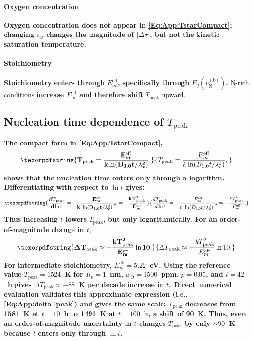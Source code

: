 \documentclass[preprint,12pt,sort&compress]{elsarticle}
\newcommand{\?}{\stackrel{?}{=}}
\providecommand{\DIFaddtex}[1]{{\bf #1}} %
\providecommand{\DIFdeltex}[1]{} %
\providecommand{\DIFaddbegin}{\protect\color{blue}} %
\providecommand{\DIFaddend}{\protect\color{black}} %
\providecommand{\DIFdelbegin}{\protect\color{red}} %
\providecommand{\DIFdelend}{\protect\color{black}} %
\providecommand{\DIFadd}[1]{\texorpdfstring{\DIFaddtex{#1}}{#1}} %
\providecommand{\DIFdel}[1]{\texorpdfstring{\DIFdeltex{#1}}{}} %
\begin{document}
\paragraph{\DIFadd{Oxygen concentration}} \DIFadd{Oxygen concentration does not appear in \cref{Eq:App:TstarCompact}; changing $c_\text{O}$ changes the magnitude of $|\Delta\sigma|$, but not the kinetic saturation temperature.
}

\paragraph{\DIFadd{Stoichiometry}} \DIFadd{Stoichiometry enters through $E_m^\mathrm{eff}$, specifically through }\DIFaddend $E_f(v_\text{N}^{(\text{b})})$\DIFdelbegin \DIFdel{: }\DIFdelend \DIFaddbegin \DIFadd{. }\DIFaddend N-rich conditions \DIFdelbegin \DIFdel{(higher $E_f$) shift }\DIFdelend \DIFaddbegin \DIFadd{increase $E_m^\mathrm{eff}$ and therefore shift }\DIFaddend $T_\text{peak}$ upward.
\DIFdelbegin %
\DIFdelend 

\DIFaddbegin \subsection{\DIFadd{Nucleation time dependence of }\texorpdfstring{$T_\text{peak}$}{Tpeak}}
\label{App:Tpeak:tdep}

\DIFadd{The compact form in \cref{Eq:App:TstarCompact},
}\begin{equation}
\DIFadd{T_\text{peak} = \frac{E_m^\mathrm{eff}}{k\ln\!\left(D_{1,0}t/\lambda_v^2\right)},
}\end{equation}
\DIFadd{shows that the nucleation time enters only through a logarithm. Differentiating with respect to $\ln t$ gives:
}\begin{equation}
\DIFadd{\frac{dT_\text{peak}}{d\ln t} = -\frac{ E_m^\mathrm{eff} }{ k \left[ \ln\!\left(D_{1,0}t/\lambda_v^2\right) \right]^2 }
= -\frac{ kT_\text{peak}^2 }{ E_m^\mathrm{eff} }.
\label{Eq:App:dTpeak_dlogt}
}\end{equation}
\DIFadd{Thus increasing $t$ lowers $T_\text{peak}$, but only logarithmically. For an order-of-magnitude change in $t$,
}\begin{equation}
\DIFadd{\Delta T_\text{peak} \approx -\frac{ kT_\text{peak}^2 }{ E_m^\mathrm{eff} } \ln 10.
\label{Eq:App:deltaTpeak}
}\end{equation}
\DIFadd{For intermediate stoichiometry, $E_m^\mathrm{eff}=5.22$~eV. Using the reference value $T_\text{peak}=1524$~K for $R_v=1$~nm, $w_\text{O}=1500$~ppm, $p=0.05$, and $t=42$~h gives $\Delta T_\text{peak} \approx -88$~K per decade increase in $t$. Direct numerical evaluation validates this approximate expression (i.e., \cref{Eq:App:deltaTpeak}) and gives the same scale: $T_\text{peak}$ decreases from 1581~K at $t=10$~h to 1491~K at $t=100$~h, a shift of 90~K. Thus, even an order-of-magnitude uncertainty in $t$ changes $T_\text{peak}$ by only $\sim 90$~K because $t$ enters only through $\ln t$.
}
\end{document}
